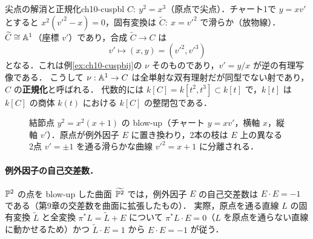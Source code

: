 \begin{myex}{尖点の解消と正規化}{ch10-cuspbl}
$C:\ y^2=x^3$（原点で尖点）．チャート1で $y=xv'$ とすると $x^2(v'^2-x)=0$，固有変換は $\widetilde C:\ x=v'^2$ で滑らか（放物線）．
$\widetilde C\cong\mathbb{A}^1$（座標 $v'$）であり，合成 $\widetilde C\to C$ は
\[
  v'\mapsto(x,y)=(v'^2,v'^3)
\]
となる．これは例\ref{ex:ch10-cuspbij}の $\nu$ そのものであり，$v'=y/x$ が逆の有理写像である．
こうして $\nu:\mathbb{A}^1\to C$ は全単射な双有理射だが同型でない射であり，$C$ の\textbf{正規化}と呼ばれる．
代数的には $k[C]=k[t^2,t^3]\subset k[t]$ で，$k[t]$ は $k[C]$ の商体 $k(t)$ における $k[C]$ の整閉包である．
\end{myex}

\begin{figure}[htbp]
\centering
{}
\caption{結節点 $y^2=x^2(x+1)$ の blow-up（チャート $y=xv'$，横軸 $x$，縦軸 $v'$）．原点が例外因子 $E$ に置き換わり，2本の枝は $E$ 上の異なる2点 $v'=\pm1$ を通る滑らかな曲線 $v'^2=x+1$ に分離される．}
\label{fig:ch10-blowup}
\end{figure}

\paragraph{例外因子の自己交差数．}
$\mathbb{P}^2$ の点を blow-up した曲面 $\widetilde{\mathbb{P}^2}$ では，例外因子 $E$ の自己交差数は $E\cdot E=-1$ である（第9章の交差数を曲面に拡張したもの）．
実際，原点を通る直線 $L$ の固有変換 $\widetilde L$ と全変換 $\pi^*L=\widetilde L+E$ について $\pi^*L\cdot E=0$（$L$ を原点を通らない直線に動かせるため）かつ $\widetilde L\cdot E=1$ から $E\cdot E=-1$ が従う．

